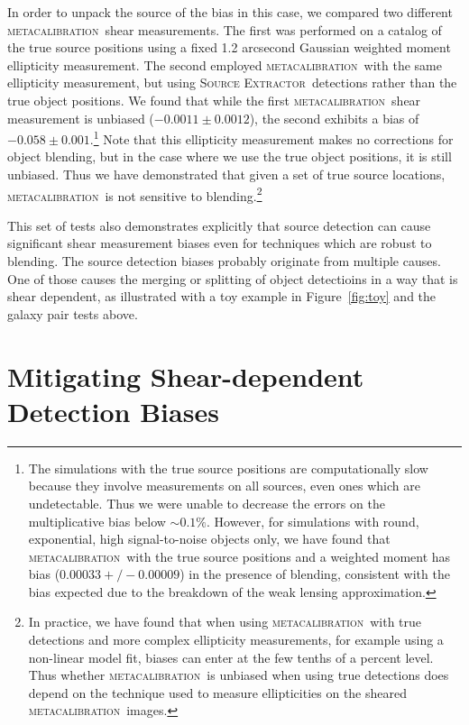 \documentclass[fleqn,useAMS,usenatbib]{mnras}
\newcommand{\mcal}{\textsc{metacalibration}}
\newcommand{\sx}{\textsc{Source Extractor}}
\begin{document}
In order to unpack the source of the bias in this case, we compared two
different \mcal\ shear measurements. The first was performed on a catalog of the true
source positions using a fixed 1.2 arcsecond Gaussian weighted moment
ellipticity measurement. The second employed \mcal\ with the same ellipticity
measurement, but using \sx\ detections rather than the true object positions. We
found that while the first \mcal\ shear measurement is unbiased
($-0.0011\pm0.0012$), the second exhibits a bias of
$-0.058\pm0.001$.\footnote{The simulations with the true source positions are
computationally slow because they involve measurements on all sources, even
ones which are undetectable. Thus we were unable to decrease the errors on the
multiplicative bias below $\sim0.1\%$. However, for simulations with round,
exponential, high signal-to-noise objects only, we have found that \mcal\ with
the true source positions and a weighted moment has bias ($0.00033 +/-
0.00009$) in the presence of blending, consistent with the bias expected due to
the breakdown of the weak lensing approximation.} Note that this ellipticity
measurement makes no corrections for object blending, but in the case where we
use the true object positions, it is still unbiased. Thus we have demonstrated
that given a set of true source locations, \mcal\ is not sensitive to
blending.\footnote{In practice, we have found that when using \mcal\ with true
detections and more complex ellipticity measurements, for example using a
non-linear model fit, biases can enter at the few tenths of a percent level.
Thus whether \mcal\ is unbiased when using true detections does depend on the
technique used to measure ellipticities on the sheared \mcal\ images.}

This set of tests also demonstrates explicitly that source detection can cause
significant shear measurement biases even for techniques which are robust to
blending. The source detection biases probably originate from multiple causes.
One of those causes the merging or splitting of object detectioins in a way
that is shear dependent, as illustrated with a toy example in
Figure~\ref{fig:toy} and the galaxy pair tests above.


\section{Mitigating Shear-dependent Detection Biases}
\label{sec:mitigate}
\end{document}
